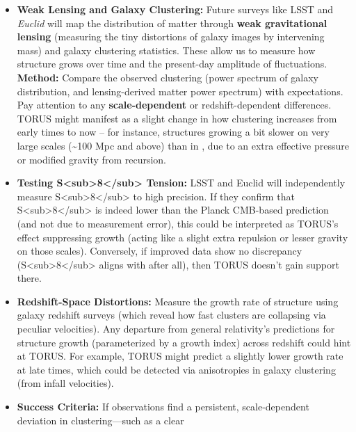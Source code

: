 \documentclass[
]{article}
\begin{document}
\begin{itemize}
  \begin{itemize}
  \item
    \textbf{Weak Lensing and Galaxy Clustering:} Future surveys like
    LSST and \emph{Euclid} will map the distribution of matter through
    \textbf{weak gravitational lensing} (measuring the tiny distortions
    of galaxy images by intervening mass) and galaxy clustering
    statistics. These allow us to measure how structure grows over time
    and the present-day amplitude of fluctuations. \textbf{Method:}
    Compare the observed clustering (power spectrum of galaxy
    distribution, and lensing-derived matter power spectrum) with \LambdaCDM
    expectations. Pay attention to any \textbf{scale-dependent} or
    redshift-dependent differences. TORUS might manifest as a slight
    change in how clustering increases from early times to now -- for
    instance, structures growing a bit slower on very large scales
    (\textasciitilde100 Mpc and above) than in \LambdaCDM, due to an extra
    effective pressure or modified gravity from recursion.
  \item
    \textbf{Testing
    S\textless sub\textgreater8\textless/sub\textgreater{} Tension:}
    LSST and Euclid will independently measure
    S\textless sub\textgreater8\textless/sub\textgreater{} to high
    precision. If they confirm that
    S\textless sub\textgreater8\textless/sub\textgreater{} is indeed
    lower than the Planck CMB-based prediction (and not due to
    measurement error), this could be interpreted as TORUS's effect
    suppressing growth (acting like a slight extra repulsion or lesser
    gravity on those scales)\hspace{0pt}. Conversely, if improved data
    show no discrepancy
    (S\textless sub\textgreater8\textless/sub\textgreater{} aligns with
    \LambdaCDM after all), then TORUS doesn't gain support there.
  \item
    \textbf{Redshift-Space Distortions:} Measure the growth rate of
    structure using galaxy redshift surveys (which reveal how fast
    clusters are collapsing via peculiar velocities). Any departure from
    general relativity's predictions for structure growth (parameterized
    by a growth index) across redshift could hint at TORUS. For example,
    TORUS might predict a slightly lower growth rate at late times,
    which could be detected via anisotropies in galaxy clustering (from
    infall velocities).
  \item
    \textbf{Success Criteria:} If observations find a persistent,
    scale-dependent deviation in clustering---such as a clear

\end{itemize}
\end{itemize}
\end{document}
